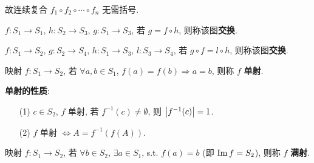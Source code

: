\documentclass{note}
\begin{document}
故连续复合 $f_1\circ f_2\circ\cdots\circ f_n$ 无需括号.

\begin{df}[交换图]
    $f: S_1\rightarrow S_1$, $h:S_2\rightarrow S_3$, $g:S_1\rightarrow S_3$, 若 $g=f\circ h$, 则称该图\textbf{交换}.
    \begin{center}
    \end{center}

    $f:S_1\rightarrow S_2$, $g:S_2\rightarrow S_4$, $h:S_1\rightarrow S_3$, $l:S_3\rightarrow S_4$, 若 $g\circ f=l\circ h$, 则称该图\textbf{交换}.
    \begin{center}
    \end{center}
\end{df}

\begin{df}
    映射 $f:S_1\rightarrow S_2$, 若 $\forall a,b\in S_1$, $f(a)=f(b)\Longrightarrow a=b$, 则称 $f$ \textbf{单射}.
\end{df}

\textbf{单射的性质}:
\begin{itemize}
    \item[(1)] $c\in S_2$, $f$ 单射, 若 $f^{-1}(c)\neq\emptyset$, 则 $\left\lvert f^{-1}(c)\right\rvert=1$.
    \item[(2)] $f$ 单射 $\Longleftrightarrow A=f^{-1}(f(A))$.
\end{itemize}

\begin{df}[满射 (Surjective)]
    映射 $f:S_1\rightarrow S_2$, 若 $\forall b\in S_2$, $\exists a\in S_1$, s.t. $f(a)=b$ (即 $\operatorname{Im} f=S_2$), 则称 $f$ \textbf{满射}.
\end{df}
\end{document}

